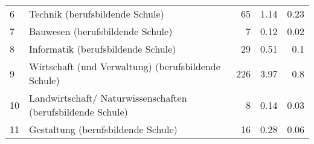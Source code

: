 \begin{longtable}{lXrrr}
     6 &
     \multicolumn{1}{X}{ Technik (berufsbildende Schule)   } &


       \num{65} &
       \num[round-mode=places,round-precision=2]{1,14} &
         \num[round-mode=places,round-precision=2]{0,23} \\

     7 &
     \multicolumn{1}{X}{ Bauwesen (berufsbildende Schule)   } &


       \num{7} &
       \num[round-mode=places,round-precision=2]{0,12} &
         \num[round-mode=places,round-precision=2]{0,02} \\

     8 &
     \multicolumn{1}{X}{ Informatik (berufsbildende Schule)   } &


       \num{29} &
       \num[round-mode=places,round-precision=2]{0,51} &
         \num[round-mode=places,round-precision=2]{0,1} \\

     9 &
     \multicolumn{1}{X}{ Wirtschaft (und Verwaltung) (berufsbildende Schule)   } &


       \num{226} &
       \num[round-mode=places,round-precision=2]{3,97} &
         \num[round-mode=places,round-precision=2]{0,8} \\

     10 &
     \multicolumn{1}{X}{ Landwirtschaft/ Naturwissenschaften (berufsbildende Schule)   } &


       \num{8} &
       \num[round-mode=places,round-precision=2]{0,14} &
         \num[round-mode=places,round-precision=2]{0,03} \\

     11 &
     \multicolumn{1}{X}{ Gestaltung (berufsbildende Schule)   } &


       \num{16} &
       \num[round-mode=places,round-precision=2]{0,28} &
         \num[round-mode=places,round-precision=2]{0,06} \\


\end{longtable}
